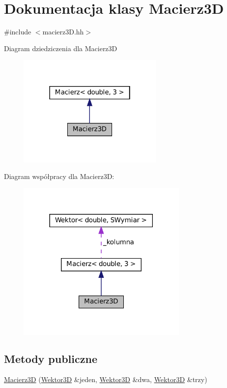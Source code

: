 \hypertarget{class_macierz3_d}{}\section{Dokumentacja klasy Macierz3D}
\label{class_macierz3_d}


{\ttfamily \#include $<$macierz3\+D.\+hh$>$}



Diagram dziedziczenia dla Macierz3D\nopagebreak
\begin{figure}[H]
\begin{center}
\leavevmode
\includegraphics[width=202pt]{class_macierz3_d__inherit__graph}
\end{center}
\end{figure}


Diagram współpracy dla Macierz3D\+:\nopagebreak
\begin{figure}[H]
\begin{center}
\leavevmode
\includegraphics[width=237pt]{class_macierz3_d__coll__graph}
\end{center}
\end{figure}
\subsection*{Metody publiczne}
\begin{DoxyCompactItemize}
\item 
\mbox{\hyperlink{class_macierz3_d_a815b0fe484cefae2f0f798a0c45b55c7}{Macierz3D}} (\mbox{\hyperlink{class_wektor3_d}{Wektor3D}} \&jeden, \mbox{\hyperlink{class_wektor3_d}{Wektor3D}} \&dwa, \mbox{\hyperlink{class_wektor3_d}{Wektor3D}} \&trzy)
\end{DoxyCompactItemize}


